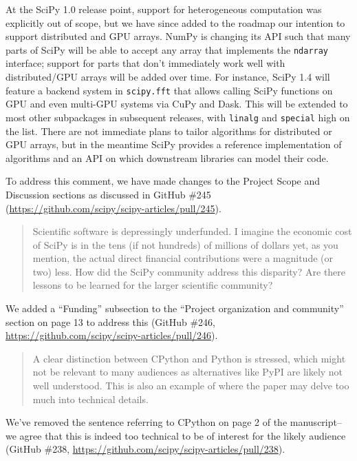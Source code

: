 \documentclass[10pt,stdletter,dateno]{newlfm}
\begin{document}
\begin{newlfm}
At the SciPy 1.0 release point, support for heterogeneous computation was explicitly out of scope, but we have since added to the roadmap our intention to support distributed and GPU arrays. NumPy is changing its API such that many parts of SciPy will be able to accept any array that implements the \texttt{ndarray} interface; support for parts that don't immediately work well with distributed/GPU arrays will be added over time. For instance, SciPy 1.4 will feature a backend system in \texttt{scipy.fft} that allows calling SciPy functions on GPU and even multi-GPU systems via CuPy and Dask. This will be extended to most other subpackages in subsequent releases, with \texttt{linalg} and \texttt{special} high on the list. There are not immediate plans to tailor algorithms for distributed or GPU arrays, but in the meantime SciPy provides a reference implementation of algorithms and an API on which downstream libraries can model their code.

To address this comment, we have made changes to the Project Scope and Discussion sections as discussed in GitHub \#245 (\url{https://github.com/scipy/scipy-articles/pull/245}).

\begin{quote}
Scientific software is depressingly underfunded. I imagine the economic cost of SciPy is in the tens (if not hundreds) of millions of dollars yet, as you mention, the actual direct financial contributions were a magnitude (or two) less. How did the SciPy community address this disparity? Are there lessons to be learned for the larger scientific community?
\end{quote}

We added a ``Funding'' subsection to the ``Project organization and community'' section on page 13 to address this (GitHub \#246, \url{https://github.com/scipy/scipy-articles/pull/246}). 

\begin{quote}
A clear distinction between CPython and Python is stressed, which might not be relevant to many audiences as alternatives like PyPI are likely not well understood. This is also an example of where the paper may delve too much into technical details.
\end{quote}

We've removed the sentence referring to CPython on page 2 of the manuscript--we agree that this is indeed too technical to be of interest for the likely audience (GitHub \#238, \url{https://github.com/scipy/scipy-articles/pull/238}). 


\end{newlfm}
\end{document}
